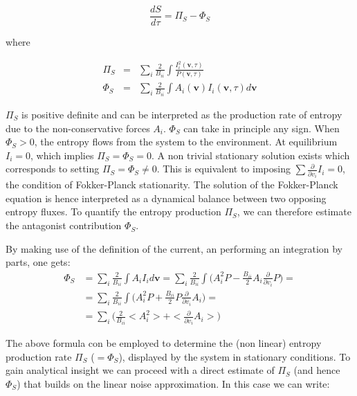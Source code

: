\documentclass[showpacs,prl,superscriptaddress,nofootinbib, twocolumn]{revtex4}
\begin{document}
\[
\frac{dS}{d\tau}=\Pi_S-\Phi_S
\]

where

\begin{eqnarray}
{\Pi_S}&=&\sum_i \frac{2}{B_{ii}}\int \frac{I_i^2({\boldsymbol v},\tau)}{P({\boldsymbol v},\tau)} \\
{\Phi_S}&=&\sum_i \frac{2}{B_{ii}}\int A_i({\boldsymbol v})I_i({\boldsymbol v},\tau) d{\boldsymbol v} \nonumber
\end{eqnarray}


$\Pi_S$ is positive definite and can be interpreted as the production rate of entropy due to the non-conservative forces $A_i$. 
$\Phi_S$ can take in principle any sign. When $\Phi_S>0$, the entropy flows from the system to the environment. At equilibrium $I_i=0$, which implies $\Pi_S=\Phi_S=0$. A non trivial stationary solution exists which corresponds to setting $\Pi_S=\Phi_S \ne 0$. This is equivalent to imposing  $\sum \frac{\partial}{\partial v_i} I_i=0$, the condition of Fokker-Planck stationarity. The solution of the Fokker-Planck equation is hence interpreted as a dynamical balance between two opposing entropy fluxes. To quantify the entropy production $\Pi_S$, we can therefore estimate the antagonist contribution $\Phi_S$.

By making use of the definition of the current,  an performing an integration by parts, one gets:
\begin{equation}
\begin{split}
\Phi_S &=\sum_i\frac{2}{B_{ii}}\int A_i I_i d\boldsymbol v=\sum_i\frac{2}{B_{ii}}\int \big( A_i^2 P-\frac{B_{ii}}{2}A_i\frac{\partial}{\partial v_i}P)=\\
&= \sum_i\frac{2}{B_{ii}}\int \big( A_i^2 P+\frac{B_{ii}}{2}P\frac{\partial}{\partial v_i}A_i)=\\ 
&= \sum_i \big( \frac{2}{B_{ii}} <A_i^2 >+<\frac{\partial}{\partial v_i}A_i>\big)
\end{split}
\label{PhiNonLin}
\end{equation}


The above formula con be employed to determine the (non linear) entropy production rate $\Pi_S$ ($=\Phi_S$), displayed by the system in  stationary conditions. To gain analytical insight we can proceed with a direct estimate of $\Pi_S$ (and hence $\Phi_S$) that builds on the linear noise approximation. In this case we can write:
\end{document}
